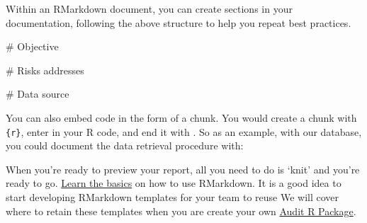 \documentclass[
]{book}
\newenvironment{Shaded}{\begin{snugshade}}{\end{snugshade}}
\newcommand{\BaseNTok}[1]{\textcolor[rgb]{0.00,0.00,0.81}{#1}}
\newcommand{\FunctionTok}[1]{\textcolor[rgb]{0.00,0.00,0.00}{#1}}
\newcommand{\NormalTok}[1]{#1}
\begin{document}
Within an RMarkdown document, you can create sections in your documentation, following the above structure to help you repeat best practices.

\begin{Shaded}
\begin{Highlighting}[]
\FunctionTok{# Objective}

\FunctionTok{# Risks addresses}

\FunctionTok{# Data source}
\end{Highlighting}
\end{Shaded}

You can also embed code in the form of a chunk. You would create a chunk with \texttt{\textasciigrave{}\textasciigrave{}\textasciigrave{}\{r\}}, enter in your R code, and end it with \texttt{\textasciigrave{}\textasciigrave{}\textasciigrave{}}. So as an example, with our database, you could document the data retrieval procedure with:

\begin{Shaded}
\end{Shaded}

When you're ready to preview your report, all you need to do is `knit' and you're ready to go. \href{https://rmarkdown.rstudio.com/lesson-1.html}{Learn the basics} on how to use RMarkdown. It is a good idea to start developing RMarkdown templates for your team to reuse We will cover where to retain these templates when you are create your own \protect\hyperlink{auditpackage}{Audit R Package}.
\end{document}
